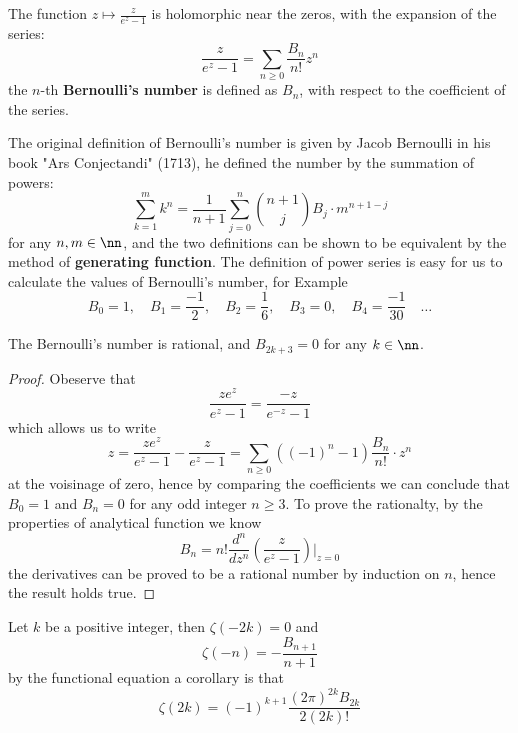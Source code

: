 \begin{colordefinition}
    The function $z \mapsto \frac{z}{e^z-1}$ is holomorphic near the zeros, with the expansion of the series:
    \[\frac{z}{e^z-1}  = \sum_{n \geq 0 } \frac{B_n}{n!}z^n\]
    the \(n\)-th \textbf{Bernoulli's number} is defined  as $B_n$, with respect to the coefficient of the series. 
\end{colordefinition}

The original definition of Bernoulli's number is given by Jacob Bernoulli in his book "Ars Conjectandi" (1713), he defined the number by the summation of powers:
\[\sum_{k=1}^m k^n = \frac{1}{n+1} \sum_{j=0}^n \binom{n+1}{j} B_j \cdot m^{n+1-j}\]
for any $n,m \in \nn$, and the two definitions can be shown to be equivalent by the method of \textbf{generating function}. The definition of power series is easy for us to calculate the values of Bernoulli's number, for Example
\[B_0 = 1, \quad B_1 = \frac{-1}{2}, \quad B_2 = \frac{1}{6}, \quad B_3 = 0, \quad B_4 = \frac{-1}{30} \quad \dots\]
\begin{lemma}
    The Bernoulli's number is rational, and \(B_{2k+3} = 0\) for any \(k \in \nn\).
\end{lemma}
\begin{proof}
    Obeserve that 
    \[\frac{ze^z}{e^z - 1} = \frac{-z}{e^{-z}-1} \]
    which allows us to write
    \[z = \frac{ze^z}{e^z-1}-\frac{z}{e^z-1} = \sum_{n\geq 0} ((-1)^n-1)\frac{B_n}{n!} \cdot z^n \]
    at the voisinage of zero, hence by comparing the coefficients we can conclude that \(B_0 = 1\) and \(B_n = 0\) for any odd integer \(n \geq 3\). To prove the rationalty, by the properties of analytical function we know
    \[B_n = n! \frac{d^n}{dz^n} \left(\frac{z}{e^z-1}\right) \bigg|_{z=0}\]
    the derivatives can be proved to be a rational number by induction on \(n\), hence the result holds true. 
\end{proof}

\begin{colorproposition}
    Let \(k\) be a positive integer, then \(\zeta(-2k) = 0\) and
    \[\zeta(-n) = - \frac{B_{n+1}}{n+1} \]
    by the functional equation a corollary is that
    \[\zeta(2k) = (-1)^{k+1} \frac{(2\pi)^{2k}B_{2k}}{2(2k)!}  \]
\end{colorproposition}

